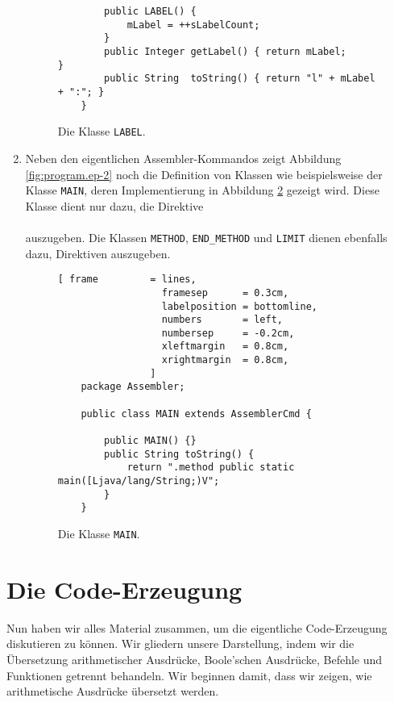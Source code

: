 \begin{enumerate}
\begin{figure}[!ht]
\begin{Verbatim}
        public LABEL() {
            mLabel = ++sLabelCount;
        }
        public Integer getLabel() { return mLabel;             }
        public String  toString() { return "l" + mLabel + ":"; }
    }
\end{Verbatim}
\vspace*{-0.3cm}
\caption{Die Klasse \texttt{LABEL}.}
\label{fig:LABEL.java}
\end{figure}
\item Neben den eigentlichen Assembler-Kommandos zeigt Abbildung \ref{fig:program.ep-2}
      noch die Definition von Klassen wie beispielsweise der Klasse \texttt{MAIN}, deren
      Implementierung in Abbildung \ref{fig:MAIN.java} gezeigt wird.  Diese Klasse dient nur
      dazu, die Direktive 
      \\[0.2cm]
      \hspace*{1.3cm}
      \qote{.method public static main([Ljava/lang/String;)V} 
      \\[0.2cm]
      auszugeben.  Die Klassen \texttt{METHOD}, \texttt{END\_METHOD} und \texttt{LIMIT}
      dienen ebenfalls dazu, Direktiven auszugeben.

      \begin{figure}[!ht]
        \centering
        \begin{Verbatim}[ frame         = lines, 
                  framesep      = 0.3cm, 
                  labelposition = bottomline,
                  numbers       = left,
                  numbersep     = -0.2cm,
                  xleftmargin   = 0.8cm,
                  xrightmargin  = 0.8cm,
                ]
    package Assembler;
    
    public class MAIN extends AssemblerCmd {
    
        public MAIN() {}
        public String toString() {
            return ".method public static main([Ljava/lang/String;)V";
        }
    }

              \end{Verbatim}
              \vspace*{-0.3cm}
              \caption{Die Klasse \texttt{MAIN}.}
              \label{fig:MAIN.java}
        \end{figure}       
\end{enumerate}
\vspace*{\fill}
\pagebreak

\section{Die Code-Erzeugung}
Nun haben wir alles Material zusammen, um die eigentliche Code-Erzeugung diskutieren zu k\"onnen.
Wir gliedern unsere Darstellung, indem wir die \"Ubersetzung arithmetischer Ausdr\"ucke,
Boole'schen Ausdr\"ucke, Befehle und Funktionen getrennt behandeln.  Wir beginnen damit, dass wir
zeigen, wie arithmetische Ausdr\"ucke \"ubersetzt werden.


